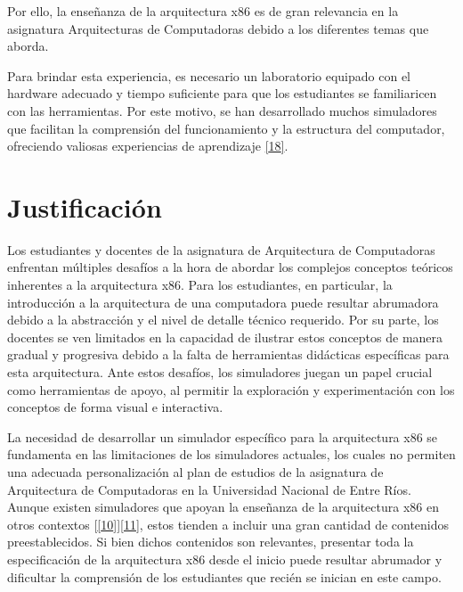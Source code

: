 \documentclass[12pt,oneside]{templates/unerthesis}
\begin{document}
Por ello, la enseñanza de la arquitectura x86 es de gran relevancia en la asignatura Arquitecturas de Computadoras debido a los diferentes temas que aborda.

Para brindar esta experiencia, es necesario un laboratorio equipado con el hardware adecuado y tiempo suficiente para que los estudiantes se familiaricen con las herramientas. Por este motivo, se han desarrollado muchos simuladores que facilitan la comprensión del funcionamiento y la estructura del computador, ofreciendo valiosas experiencias de aprendizaje \protect\hyperlink{ref-skrien_cpu_2001}{{[}18{]}}.

\hypertarget{justificaciuxf3n}{%
\section{Justificación}\label{justificaciuxf3n}}

Los estudiantes y docentes de la asignatura de Arquitectura de Computadoras enfrentan múltiples desafíos a la hora de abordar los complejos conceptos teóricos inherentes a la arquitectura x86. Para los estudiantes, en particular, la introducción a la arquitectura de una computadora puede resultar abrumadora debido a la abstracción y el nivel de detalle técnico requerido. Por su parte, los docentes se ven limitados en la capacidad de ilustrar estos conceptos de manera gradual y progresiva debido a la falta de herramientas didácticas específicas para esta arquitectura. Ante estos desafíos, los simuladores juegan un papel crucial como herramientas de apoyo, al permitir la exploración y experimentación con los conceptos de forma visual e interactiva.

La necesidad de desarrollar un simulador específico para la arquitectura x86 se fundamenta en las limitaciones de los simuladores actuales, los cuales no permiten una adecuada personalización al plan de estudios de la asignatura de Arquitectura de Computadoras en la Universidad Nacional de Entre Ríos. Aunque existen simuladores que apoyan la enseñanza de la arquitectura x86 en otros contextos {[}\protect\hyperlink{ref-radivojevic_design_2011}{{[}10{]}}{]}\protect\hyperlink{ref-nikolic_survey_2009}{{[}11{]}}, estos tienden a incluir una gran cantidad de contenidos preestablecidos. Si bien dichos contenidos son relevantes, presentar toda la especificación de la arquitectura x86 desde el inicio puede resultar abrumador y dificultar la comprensión de los estudiantes que recién se inician en este campo.
\end{document}
